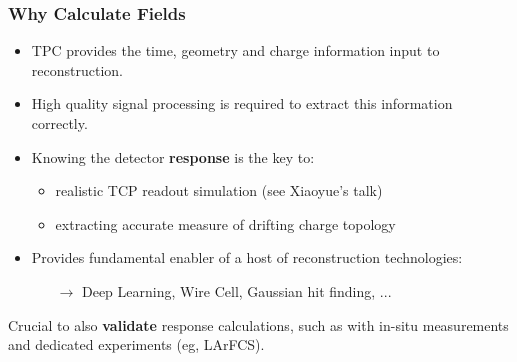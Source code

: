 \documentclass[xcolor=dvipsnames]{beamer}
\begin{document}
\begin{frame}
  \frametitle{Why Calculate Fields}

  \begin{itemize}
  \item TPC provides the time, geometry and charge information input
    to reconstruction.
  \item High quality signal processing is required to extract this
    information correctly.
  \item Knowing the detector \textbf{response} is the key to:
    \begin{itemize}
    \item realistic TCP readout simulation (see Xiaoyue's talk)
    \item extracting accurate measure of drifting charge topology
    \end{itemize}
  \item Provides fundamental enabler of a host of reconstruction technologies:
    \begin{itemize}
    \item[$\rightarrow$] Deep Learning, Wire Cell, Gaussian hit finding, ...
    \end{itemize}
  \end{itemize}

  Crucial to also \textbf{validate} response calculations, such as with in-situ
  measurements and dedicated experiments (eg, LArFCS).
\end{frame}
\end{document}
